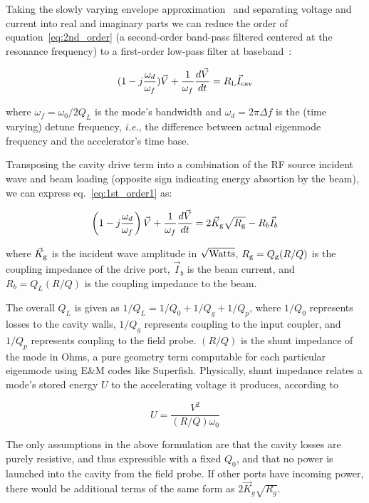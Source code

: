 \documentclass[a4paper,12pt]{article}
\begin{document}
Taking the slowly varying envelope approximation~\cite{ref:svea} and separating voltage and current into real and imaginary parts we can reduce the order of equation~\ref{eq:2nd_order} (a second-order band-pass filtered centered at the resonance frequency) to a first-order low-pass filter at baseband~\cite{ref:schilcher}:

\begin{equation}
  (1-j\frac{\omega_d}{\omega_f})\vec V + \frac{1}{\omega_f}\frac{d\vec V}{dt} = R_{\rm L} \vec I_{\rm cav}
  \label{eq:1st_order1}
\end{equation}

where $\omega_f=\omega_0/2Q_L$ is the mode's bandwidth and $\omega_d=2\pi\Delta f$ is the (time varying) detune frequency, {\it i.e.}, the difference between actual eigenmode frequency and the accelerator's time base.

Transposing the cavity drive term into a combination of the RF source incident wave and beam loading (opposite sign indicating energy absortion by the beam), we can express eq.~\ref{eq:1st_order1} as:

\begin{equation}
  \left(1-j{\omega_d\over \omega_f}\right)\vec V + {1\over\omega_f}{d\vec V\over dt} =  2\vec K_{\rm g}\sqrt{R_{\rm g}} - R_b\vec I_b
  \label{eq:1st_order2}
\end{equation}

where $\vec K_{\rm g}$ is the incident wave amplitude in $\sqrt{\rm Watts}$, $R_{\rm g}=Q_{\rm g}(R/Q)$ is the coupling impedance of the drive port, $\vec I_b$ is the beam current, and $R_b=Q_L(R/Q)$ is the coupling impedance to the beam.


The overall $Q_L$ is given as $1/Q_L=1/Q_0+1/Q_g+1/Q_p$, where $1/Q_0$ represents losses to the cavity walls, $1/Q_g$ represents coupling to the input coupler, and $1/Q_p$ represents coupling to the field probe. $(R/Q)$ is the shunt impedance of the mode in Ohms, a pure geometry term computable for each particular eigenmode using E\&M codes like Superfish. Physically, shunt impedance relates a mode's stored energy $U$ to the accelerating voltage it produces, according to 

\begin{equation}
  U = \frac{V^2}{(R/Q)\omega_0}
\end{equation}

The only assumptions in the above formulation are that the cavity losses are purely resistive, and thus expressible with a fixed $Q_0$, and that no power is launched into the cavity from the field probe.  If other ports have incoming power, there would be additional terms of the same form as $2\vec K_g\sqrt{R_g}$.
\end{document}
